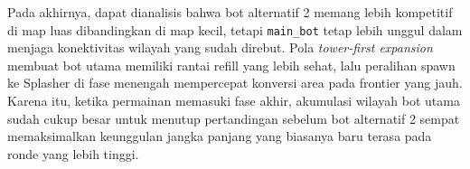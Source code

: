 Pada akhirnya, dapat dianalisis bahwa bot alternatif 2 memang lebih kompetitif di map luas dibandingkan di map kecil, tetapi \texttt{main\_bot} tetap lebih unggul dalam menjaga konektivitas wilayah yang sudah direbut. Pola \textit{tower-first expansion} membuat bot utama memiliki rantai refill yang lebih sehat, lalu peralihan spawn ke Splasher di fase menengah mempercepat konversi area pada frontier yang jauh. Karena itu, ketika permainan memasuki fase akhir, akumulasi wilayah bot utama sudah cukup besar untuk menutup pertandingan sebelum bot alternatif 2 sempat memaksimalkan keunggulan jangka panjang yang biasanya baru terasa pada ronde yang lebih tinggi.


